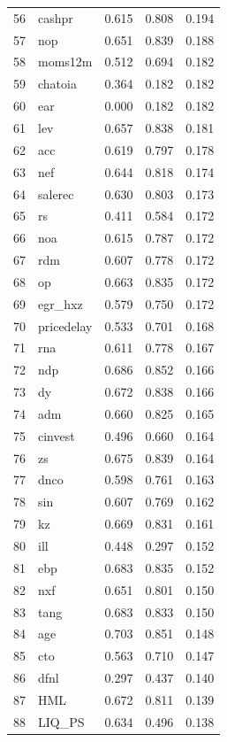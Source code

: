 \begin{footnotesize}
\begin{longtable}{rl|c|c|c}
		56 & cashpr & 0.615 & 0.808 & 0.194 \\ 
		57 & nop & 0.651 & 0.839 & 0.188 \\ 
		58 & moms12m & 0.512 & 0.694 & 0.182 \\ 
		59 & chatoia & 0.364 & 0.182 & 0.182 \\ 
		60 & ear & 0.000 & 0.182 & 0.182 \\ 
		61 & lev & 0.657 & 0.838 & 0.181 \\ 
		62 & acc & 0.619 & 0.797 & 0.178 \\ 
		63 & nef & 0.644 & 0.818 & 0.174 \\ 
		64 & salerec & 0.630 & 0.803 & 0.173 \\ 
		65 & rs & 0.411 & 0.584 & 0.172 \\ 
		66 & noa & 0.615 & 0.787 & 0.172 \\ 
		67 & rdm & 0.607 & 0.778 & 0.172 \\ 
		68 & op & 0.663 & 0.835 & 0.172 \\ 
		69 & egr\_hxz & 0.579 & 0.750 & 0.172 \\ 
		70 & pricedelay & 0.533 & 0.701 & 0.168 \\ 
		71 & rna & 0.611 & 0.778 & 0.167 \\ 
		72 & ndp & 0.686 & 0.852 & 0.166 \\ 
		73 & dy & 0.672 & 0.838 & 0.166 \\ 
		74 & adm & 0.660 & 0.825 & 0.165 \\ 
		75 & cinvest & 0.496 & 0.660 & 0.164 \\ 
		76 & zs & 0.675 & 0.839 & 0.164 \\ 
		77 & dnco & 0.598 & 0.761 & 0.163 \\ 
		78 & sin & 0.607 & 0.769 & 0.162 \\ 
		79 & kz & 0.669 & 0.831 & 0.161 \\ 
		80 & ill & 0.448 & 0.297 & 0.152 \\ 
		81 & ebp & 0.683 & 0.835 & 0.152 \\ 
		82 & nxf & 0.651 & 0.801 & 0.150 \\ 
		83 & tang & 0.683 & 0.833 & 0.150 \\ 
		84 & age & 0.703 & 0.851 & 0.148 \\ 
		85 & cto & 0.563 & 0.710 & 0.147 \\ 
		86 & dfnl & 0.297 & 0.437 & 0.140 \\ 
		87 & HML & 0.672 & 0.811 & 0.139 \\ 
		88 & LIQ\_PS & 0.634 & 0.496 & 0.138 \\ 

\end{longtable}
\end{footnotesize}

